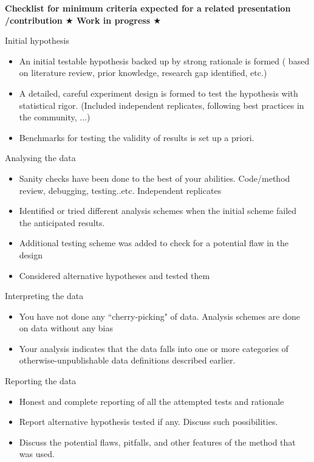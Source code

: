 \documentclass[9pt,lessons]{livecoms}
\theoremstyle{definition}
\theoremstyle{remark}
\begin{document}
\begin{Checklists*}[p!]
\textbf{Checklist for  minimum criteria expected for a related presentation /contribution $\bigstar$ Work in progress $\bigstar$}\\
\begin{checklist}{Initial hypothesis}
\begin{itemize}
\item An initial testable hypothesis backed up by strong rationale is formed ( based on literature review, prior knowledge, research gap identified, etc.)
\item A detailed, careful experiment design is formed to test the hypothesis with statistical rigor.
(Included independent replicates, following best practices in the community, ...) 
\item Benchmarks for testing the validity of results is set up a priori.
\end{itemize}
\end{checklist}

\begin{checklist}{Analysing the data}
\begin{itemize}
\item Sanity checks have been done to the best of your abilities.
Code/method review, debugging, testing..etc. Independent replicates   
\item Identified or tried different analysis schemes when the initial scheme failed the anticipated results.
\item Additional testing scheme was added to check for a potential flaw in the design
\item Considered alternative hypotheses and tested them
\end{itemize}
\end{checklist}

\begin{checklist}{Interpreting the data}
\begin{itemize}
\item You have not done any ``cherry-picking" of data. Analysis schemes are done on data without any bias
\item Your analysis indicates that the data falls into one or more categories of otherwise-unpublishable data definitions described earlier.
\end{itemize}
\end{checklist}

\begin{checklist}{Reporting the data}
\begin{itemize}
\item Honest and complete reporting of all the attempted tests and rationale
\item Report alternative hypothesis tested if any. Discuss such possibilities.
\item Discuss the potential flaws, pitfalls, and other features of the method that was used.
\end{itemize}
\end{checklist}

\end{Checklists*}
\end{document}
